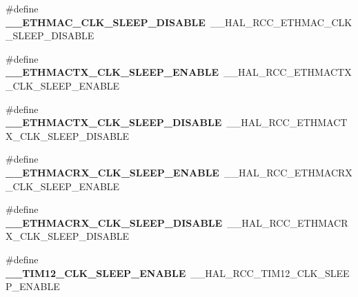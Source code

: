 \begin{DoxyCompactItemize}
\item 
\#define {\bfseries \+\_\+\+\_\+\+E\+T\+H\+M\+A\+C\+\_\+\+C\+L\+K\+\_\+\+S\+L\+E\+E\+P\+\_\+\+D\+I\+S\+A\+B\+LE}~\+\_\+\+\_\+\+H\+A\+L\+\_\+\+R\+C\+C\+\_\+\+E\+T\+H\+M\+A\+C\+\_\+\+C\+L\+K\+\_\+\+S\+L\+E\+E\+P\+\_\+\+D\+I\+S\+A\+B\+LE\hypertarget{group___h_a_l___r_c_c___aliased_gac126a734a698ab6ea80dc14acb166bcc}{}\label{group___h_a_l___r_c_c___aliased_gac126a734a698ab6ea80dc14acb166bcc}

\item 
\#define {\bfseries \+\_\+\+\_\+\+E\+T\+H\+M\+A\+C\+T\+X\+\_\+\+C\+L\+K\+\_\+\+S\+L\+E\+E\+P\+\_\+\+E\+N\+A\+B\+LE}~\+\_\+\+\_\+\+H\+A\+L\+\_\+\+R\+C\+C\+\_\+\+E\+T\+H\+M\+A\+C\+T\+X\+\_\+\+C\+L\+K\+\_\+\+S\+L\+E\+E\+P\+\_\+\+E\+N\+A\+B\+LE\hypertarget{group___h_a_l___r_c_c___aliased_ga821804d4757084a396a5737683660e0c}{}\label{group___h_a_l___r_c_c___aliased_ga821804d4757084a396a5737683660e0c}

\item 
\#define {\bfseries \+\_\+\+\_\+\+E\+T\+H\+M\+A\+C\+T\+X\+\_\+\+C\+L\+K\+\_\+\+S\+L\+E\+E\+P\+\_\+\+D\+I\+S\+A\+B\+LE}~\+\_\+\+\_\+\+H\+A\+L\+\_\+\+R\+C\+C\+\_\+\+E\+T\+H\+M\+A\+C\+T\+X\+\_\+\+C\+L\+K\+\_\+\+S\+L\+E\+E\+P\+\_\+\+D\+I\+S\+A\+B\+LE\hypertarget{group___h_a_l___r_c_c___aliased_ga2965f3df04e318e630a14190539ed94f}{}\label{group___h_a_l___r_c_c___aliased_ga2965f3df04e318e630a14190539ed94f}

\item 
\#define {\bfseries \+\_\+\+\_\+\+E\+T\+H\+M\+A\+C\+R\+X\+\_\+\+C\+L\+K\+\_\+\+S\+L\+E\+E\+P\+\_\+\+E\+N\+A\+B\+LE}~\+\_\+\+\_\+\+H\+A\+L\+\_\+\+R\+C\+C\+\_\+\+E\+T\+H\+M\+A\+C\+R\+X\+\_\+\+C\+L\+K\+\_\+\+S\+L\+E\+E\+P\+\_\+\+E\+N\+A\+B\+LE\hypertarget{group___h_a_l___r_c_c___aliased_gaa0ecc6517832ab5b303a184711cafe84}{}\label{group___h_a_l___r_c_c___aliased_gaa0ecc6517832ab5b303a184711cafe84}

\item 
\#define {\bfseries \+\_\+\+\_\+\+E\+T\+H\+M\+A\+C\+R\+X\+\_\+\+C\+L\+K\+\_\+\+S\+L\+E\+E\+P\+\_\+\+D\+I\+S\+A\+B\+LE}~\+\_\+\+\_\+\+H\+A\+L\+\_\+\+R\+C\+C\+\_\+\+E\+T\+H\+M\+A\+C\+R\+X\+\_\+\+C\+L\+K\+\_\+\+S\+L\+E\+E\+P\+\_\+\+D\+I\+S\+A\+B\+LE\hypertarget{group___h_a_l___r_c_c___aliased_gacf62579e4ae8ccbd5acef2cbc3ca7156}{}\label{group___h_a_l___r_c_c___aliased_gacf62579e4ae8ccbd5acef2cbc3ca7156}

\item 
\#define {\bfseries \+\_\+\+\_\+\+T\+I\+M12\+\_\+\+C\+L\+K\+\_\+\+S\+L\+E\+E\+P\+\_\+\+E\+N\+A\+B\+LE}~\+\_\+\+\_\+\+H\+A\+L\+\_\+\+R\+C\+C\+\_\+\+T\+I\+M12\+\_\+\+C\+L\+K\+\_\+\+S\+L\+E\+E\+P\+\_\+\+E\+N\+A\+B\+LE\hypertarget{group___h_a_l___r_c_c___aliased_gaa109db9698df3dd4643a186a11058390}{}\label{group___h_a_l___r_c_c___aliased_gaa109db9698df3dd4643a186a11058390}


\end{DoxyCompactItemize}
